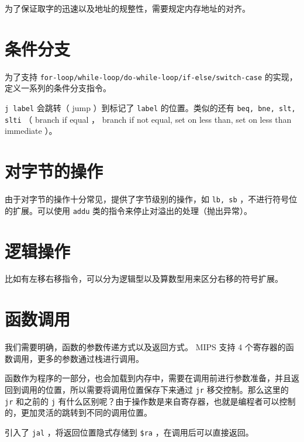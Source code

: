 \documentclass[cn,11pt,chinese,black,simple]{../elegantbook}
\begin{document}
为了保证取字的迅速以及地址的规整性，需要规定内存地址的对齐。

\section{条件分支}

为了支持 \lstinline{for-loop/while-loop/do-while-loop/if-else/switch-case} 的实现，定义一系列的条件分支指令。

\lstinline{j label} 会跳转（ jump ）到标记了 \lstinline{label} 的位置。类似的还有 \lstinline{beq, bne, slt, slti} （ branch if equal ， branch if not equal, set on less than, set on less than immediate ）。

\section{对字节的操作}

由于对字节的操作十分常见，提供了字节级别的操作，如 \lstinline{lb, sb} ，不进行符号位的扩展。可以使用 \lstinline{addu} 类的指令来停止对溢出的处理（抛出异常）。

\section{逻辑操作}

比如有左移右移指令，可以分为逻辑型以及算数型用来区分右移的符号扩展。

\section{函数调用}

我们需要明确，函数的参数传递方式以及返回方式。 MIPS 支持 4 个寄存器的函数调用，更多的参数通过栈进行调用。

函数作为程序的一部分，也会加载到内存中，需要在调用前进行参数准备，并且返回到调用的位置，所以需要将调用位置保存下来通过 \lstinline{jr} 移交控制。那么这里的 \lstinline{jr} 和之前的 \lstinline{j} 有什么区别呢？由于操作数是来自寄存器，也就是编程者可以控制的，更加灵活的跳转到不同的调用位置。

引入了 \lstinline{jal} ，将返回位置隐式存储到 \lstinline{$ra} ，在调用后可以直接返回。


\let\chapname\undefined
\ifx\mainclass\undefined
\end{document}
